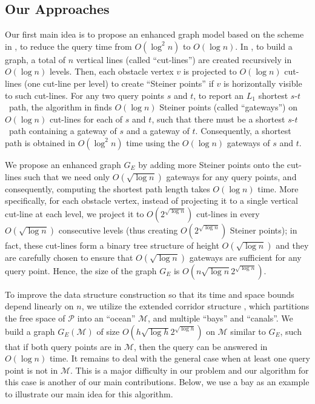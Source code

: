 \documentclass[english,runningheads,11pt]{llncs}
\def\calP{\mathcal{P}}
\def\calM{\mathcal{M}}
\def\st{$s$-$t$}
\begin{document}
\subsection{Our Approaches}

Our first main idea is to propose an enhanced graph model based on the
scheme in \cite{ref:ChenSh00,ref:ClarksonRe87,ref:ClarksonRe88}, to reduce the query
time from $O(\log^2 n)$ to $O(\log n)$. In \cite{ref:ChenSh00,ref:ClarksonRe87,ref:ClarksonRe88},
to build a graph, a total of $n$ vertical lines (called ``cut-lines'') are created recursively in $O(\log n)$ levels.
Then, each obstacle vertex $v$ is projected to $O(\log n)$ cut-lines (one cut-line per level) to create ``Steiner points'' if $v$ is horizontally visible to such cut-lines.
For any two query points $s$ and $t$, to report an $L_1$ shortest \st\ path, the algorithm in \cite{ref:ChenSh00} finds $O(\log n)$ Steiner points (called ``gateways'') on $O(\log n)$ cut-lines for each of $s$ and $t$, such that there must be a shortest \st\ path containing a gateway of $s$ and a gateway of $t$. Consequently, a shortest path is obtained in $O(\log^2 n)$ time using the $O(\log n)$ gateways of $s$ and $t$.


We propose an enhanced
graph $G_E$ by adding more Steiner points onto the cut-lines such that
we need only $O(\sqrt{\log n})$ gateways for any query points,
and consequently, computing the shortest path length takes $O(\log n)$ time. More
specifically, for each obstacle vertex, instead of projecting it to a single vertical
cut-line at each level, we project it to $O(2^{\sqrt{\log n}})$ cut-lines in
every $O(\sqrt{\log n})$
consecutive levels (thus creating $O(2^{\sqrt{\log n}})$ Steiner points); in fact,
these cut-lines form a binary tree structure of height $O(\sqrt{\log n})$ and they are carefully chosen to ensure that $O(\sqrt{\log n})$ gateways are sufficient for any query point.
Hence, the size
of the graph $G_E$ is $O(n\sqrt{\log n}2^{\sqrt{\log n}})$.


To improve the data structure construction so that its time and space bounds
depend linearly on $n$, we utilize the extended corridor
structure \cite{ref:ChenA11ESA,ref:ChenCo12arXiv,ref:ChenL113STACS},
which partitions the free space of $\calP$ into an ``ocean'' $\calM$, and
multiple ``bays'' and ``canals''. We build a graph $G_E(\calM)$
of size $O(h\sqrt{\log h} 2^{\sqrt{\log h}})$ on $\calM$ similar to $G_E$,
such that if both query points are in $\calM$, then the query can be answered in
$O(\log n)$ time. It remains to deal with the general case when at least one query
point is not in $\calM$. This is a major difficulty in our problem and our algorithm for
this case is another of our main contributions. Below, we use a bay as an example to
illustrate our main idea for this algorithm.
\end{document}
